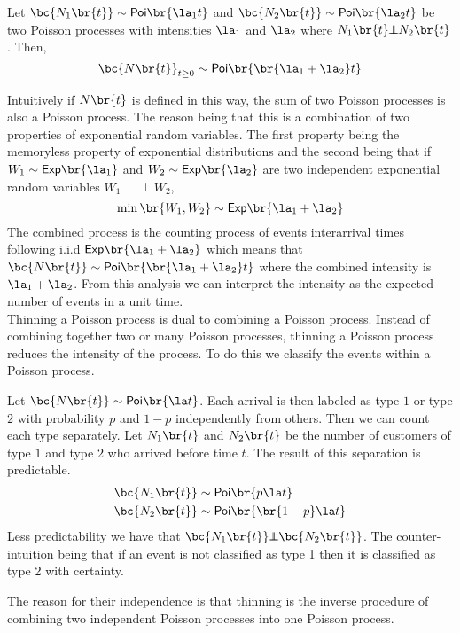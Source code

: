 \documentclass{article}
\newcommand{\indep}{\!\!\perp\!\!\!\!\perp\!\!}
\newcommand{\Poi}{\mathsf{Poi}}
\newcommand{\Ex}{\mathsf{Exp}}
\begin{document}
    \begin{definition}
         Let $\bc{N_1\br{t}} \sim \Poi \br{\la_1 t}$ and $\bc{N_2\br{t}} \sim \Poi \br{\la_2 t}$ be two Poisson processes with intensities $\la_1$ and $\la_2$ where $N_1\br{t} \indep N_2\br{t}$. Then,
        \[ \bc{N\br{t}}_{t \geq 0} \sim \Poi\br{\br{\la_1 + \la_2}t} \]
    \end{definition}

    Intuitively if $N\br{t}$ is defined in this way, the sum of two Poisson processes is also a Poisson process. The reason being that this is a combination of two properties of exponential random variables. The first property being the memoryless property of exponential distributions and the second being that if $W_1 \sim \Ex\br{\la_1}$ and $W_2 \sim \Ex\br{\la_2}$ are two independent exponential random variables $W_1 \indep W_2$,
    \[ \min \br{W_1, W_2} \sim \Ex\br{\la_1 + \la_2} \]
    The combined process is the counting process of events interarrival times following i.i.d $\Ex\br{\la_1 + \la_2}$ which means that $\bc{N\br{t}} \sim \Poi\br{\br{\la_1 + \la_2} t}$ where the combined intensity is $\la_1 + \la_2$. From this analysis we can interpret the intensity as the expected number of events in a unit time.\\

    Thinning a Poisson process is dual to combining a Poisson process. Instead of combining together two or many Poisson processes, thinning a Poisson process reduces the intensity of the process. To do this we classify the events within a Poisson process.
    \begin{definition}
         Let $\bc{N\br{t}} \sim \Poi\br{\la t}$. Each arrival is then labeled as type $1$ or type $2$ with probability $p$ and $1-p$ independently from others. Then we can count each type separately. Let $N_1\br{t}$ and $N_2\br{t}$ be the number of customers of type $1$ and type $2$ who arrived before time $t$. The result of this separation is predictable.
        \begin{align*}
            \bc{N_1\br{t}} &\sim \Poi\br{p\la t} \\
            \bc{N_2\br{t}} &\sim \Poi\br{\br{1-p}\la t}
        \end{align*}
        Less predictability we have that $\bc{N_1\br{t}} \indep \bc{N_2\br{t}}$. The counter-intuition being that if an event is not classified as type 1 then it is classified as type 2 with certainty.
    \end{definition}
    The reason for their independence is that thinning is the inverse procedure of combining two independent Poisson processes into one Poisson process.
\end{document}
